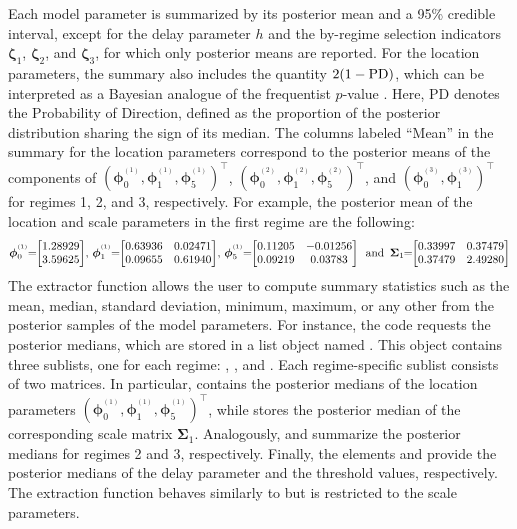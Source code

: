 Each model parameter is summarized by its posterior mean and a 95\% credible interval, except for the delay parameter $h$ and the by-regime selection indicators $\bm{\zeta}_1$, $\bm{\zeta}_2$, and $\bm{\zeta}_3$, for which only posterior means are reported. For the location parameters, the summary also includes the quantity $2(1-{\rm PD})$, which can be interpreted as a Bayesian analogue of the frequentist $p$-value \citep{MBCL19,MBL19}. Here, PD denotes the Probability of Direction, defined as the proportion of the posterior distribution sharing the sign of its median. The columns labeled ``Mean'' in the summary for the location parameters correspond to the posterior means of the components of $(\bm{\phi}_0^{^{(1)}}, \bm{\phi}_1^{^{(1)}}, \bm{\phi}_5^{^{(1)}})^{\!\top}$, $(\bm{\phi}_0^{^{(2)}}, \bm{\phi}_1^{^{(2)}}, \bm{\phi}_5^{^{(2)}})^{\!\top}$, and $(\bm{\phi}_0^{^{(3)}}, \bm{\phi}_1^{^{(3)}})^{\!\top}$ for regimes 1, 2, and 3, respectively. For example, the posterior mean of the location and scale parameters in the first regime are the following:
$$
\bm{\phi}_0^{^{(1)}}\!\!=\!\!
\begin{bmatrix}
1.28929\\ 3.59625
\end{bmatrix}\!,\,
\bm{\phi}_1^{^{(1)}}\!\!=\!\!
\begin{bmatrix}
0.63936 & 0.02471\\
0.09655 & 0.61940
\end{bmatrix}\!,\,
\bm{\phi}_5^{^{(1)}}\!\!=\!\!
\begin{bmatrix}
0.11205 &\hfill-0.01256\\
0.09219       &0.03783
\end{bmatrix}
\quad\!\!\!\text{and}\!\!\!\quad 
\bm{\Sigma}_1\!\!=\!\!
\begin{bmatrix}
0.33997  &0.37479\\
0.37479  &2.49280
\end{bmatrix}
$$
The extractor function  allows the user to compute summary statistics such as the mean, median, standard deviation, minimum, maximum, or any other from the posterior samples of the model parameters. For instance, the code  requests the posterior medians, which are stored in a list object named . This object contains three sublists, one for each regime: , , and .
Each regime-specific sublist consists of two matrices. In particular,  contains the posterior medians of the location parameters $(\bm{\phi}_0^{^{(1)}}, \bm{\phi}_1^{^{(1)}}, \bm{\phi}_5^{^{(1)}})^{\!\top}$, while  stores the posterior median of the corresponding scale matrix $\bm{\Sigma}_1$. Analogously,  and  summarize the posterior medians for regimes 2 and 3, respectively. Finally, the elements  and  provide the posterior medians of the delay parameter and the threshold values, respectively. The extraction function  behaves similarly to  but is restricted to the scale parameters. 

